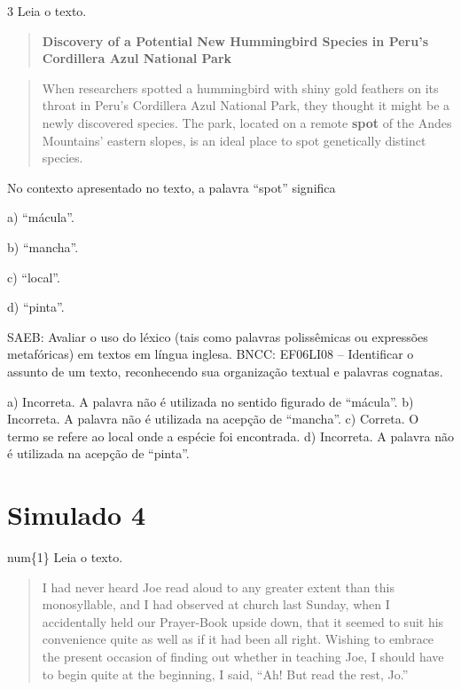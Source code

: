 \num{3} Leia o texto.

\begin{quote}
\textbf{Discovery of a Potential New Hummingbird Species in Peru's
Cordillera Azul National Park}
\end{quote}

\begin{quote}
When researchers spotted a hummingbird with shiny gold feathers on its
throat in Peru's Cordillera Azul National Park, they thought it might be
a newly discovered species. The park, located on a remote \textbf{spot}
of the Andes Mountains' eastern slopes, is an ideal place to spot
genetically distinct species.
\end{quote}


No contexto apresentado no texto, a palavra ``spot'' significa

a) ``mácula''.

b) ``mancha''.

c) ``local''.

d) ``pinta''.

SAEB: Avaliar o uso do léxico (tais como palavras polissêmicas ou
expressões metafóricas) em textos em língua inglesa. BNCC: EF06LI08 --
Identificar o assunto de um texto, reconhecendo sua organização textual
e palavras cognatas.

a) Incorreta. A palavra não é utilizada no sentido figurado de
``mácula''. b) Incorreta. A palavra não é utilizada na acepção de
``mancha''. c) Correta. O termo se refere ao local onde a espécie foi
encontrada. d) Incorreta. A palavra não é utilizada na acepção de
``pinta''.

\section{Simulado 4}\label{simulado-4}

num\{1\} Leia o texto.

\begin{quote}
I had never heard Joe read aloud to any greater extent than this
monosyllable, and I had observed at church last Sunday, when I
accidentally held our Prayer-Book upside down, that it seemed to suit
his convenience quite as well as if it had been all right. Wishing to
embrace the present occasion of finding out whether in teaching Joe, I
should have to begin quite at the beginning, I said, ``Ah! But read the
rest, Jo.''
\end{quote}

